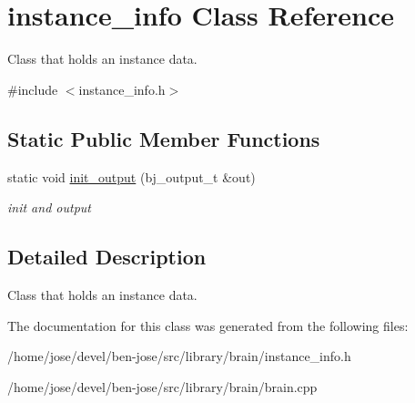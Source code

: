 \hypertarget{classinstance__info}{}\section{instance\+\_\+info Class Reference}
\label{classinstance__info}


Class that holds an instance data.  




{\ttfamily \#include $<$instance\+\_\+info.\+h$>$}

\subsection*{Static Public Member Functions}
\begin{DoxyCompactItemize}
\item 
static void \hyperlink{classinstance__info_ac3abef1483f1c792526dae1b324bc7ee}{init\+\_\+output} (bj\+\_\+output\+\_\+t \&out)\hypertarget{classinstance__info_ac3abef1483f1c792526dae1b324bc7ee}{}\label{classinstance__info_ac3abef1483f1c792526dae1b324bc7ee}

\begin{DoxyCompactList}\small\item\em init and output \end{DoxyCompactList}\end{DoxyCompactItemize}


\subsection{Detailed Description}
Class that holds an instance data. 

The documentation for this class was generated from the following files\+:\begin{DoxyCompactItemize}
\item 
/home/jose/devel/ben-\/jose/src/library/brain/instance\+\_\+info.\+h\item 
/home/jose/devel/ben-\/jose/src/library/brain/brain.\+cpp\end{DoxyCompactItemize}

